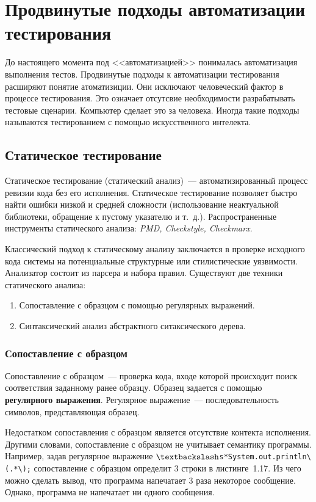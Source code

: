 \section{Продвинутые подходы автоматизации тестирования} 

До настоящего момента под <<автоматизацией>> понималась автоматизация выполнения тестов. Продвинутые подходы к автоматизации тестирования расширяют понятие атоматизиции. Они исключают человеческий фактор в процессе тестирования. Это означает отсутсвие необходимости разрабатывать тестовые сценарии. Компьютер сделает это за человека. Иногда такие подходы называются тестированием с помощью искусственного интелекта.

\subsection{Статическое тестирование} 

Статическое тестирование (статический анализ)~--- автоматизированный процесс ревизии кода без его исполнения. Статическое тестирование позволяет быстро найти ошибки низкой и средней сложности (использование неактуальной библиотеки, обращение к пустому указателю и т.~д.). Распространенные инструменты статического анализа: \textit{PMD, Checkstyle, Checkmarx}.

Классический подход к статическому анализу заключается в проверке исходного кода системы на потенциальные структурные или стилистические уязвимости. Анализатор состоит из парсера и набора правил. Существуют две техники статического анализа:


\begin{enumerate}
	\item Сопоставление с образцом с помощью регулярных выражений.
	\item Синтаксический анализ абстрактного ситаксического дерева.
\end{enumerate}


\subsubsection{Сопоставление с образцом}

Сопоставление с образцом~--- проверка кода, входе которой происходит поиск соответствия заданному ранее образцу. Образец задается с помощью \textbf{регулярного выражения}. Регулярное выражение~--- последовательность символов, представляющая образец.

Недостатком сопоставления с образцом является отсутствие контекта исполнения. Другими словами, сопоставление с образцом не учитывает семантику программы. Например, задав регулярное выражение \texttt{$\textbackslash$s*System.out.println\textbackslash(.*\textbackslash);} сопоставление с образцом определит 3 строки в листинге~1.17. Из чего можно сделать вывод, что программа напечатает 3 раза некоторое сообщение. Однако, программа не напечатает ни одного сообщения. 

